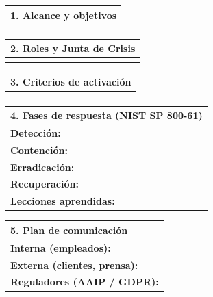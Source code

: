 \documentclass[12pt,a4paper]{article}
\renewcommand{\arraystretch}{1.25}
\begin{document}
\vspace{8pt}
\renewcommand{\arraystretch}{1.5}

\begin{tabularx}{\textwidth}{|X|}
\hline
\rowcolor{azulContinuidad!15}
\textbf{1. Alcance y objetivos} \\[2pt]
\hline
\\[1.5cm]
\hline
\end{tabularx}

\vspace{6pt}
\begin{tabularx}{\textwidth}{|X|}
\hline
\rowcolor{azulContinuidad!15}
\textbf{2. Roles y Junta de Crisis} \\[2pt]
\hline
\\[1.5cm]
\hline
\end{tabularx}

\vspace{6pt}
\begin{tabularx}{\textwidth}{|X|}
\hline
\rowcolor{azulContinuidad!15}
\textbf{3. Criterios de activaci\'on} \\[2pt]
\hline
\\[1.5cm]
\hline
\end{tabularx}

\vspace{6pt}
\begin{tabularx}{\textwidth}{|X|}
\hline
\rowcolor{azulContinuidad!15}
\textbf{4. Fases de respuesta (NIST SP 800-61)} \\[2pt]
\hline
\textbf{Detecci\'on:} \hrulefill \\[6pt]
\textbf{Contenci\'on:} \hrulefill \\[6pt]
\textbf{Erradicaci\'on:} \hrulefill \\[6pt]
\textbf{Recuperaci\'on:} \hrulefill \\[6pt]
\textbf{Lecciones aprendidas:} \hrulefill \\[1cm]
\hline
\end{tabularx}

\newpage
\begin{tabularx}{\textwidth}{|X|}
\hline
\rowcolor{azulContinuidad!15}
\textbf{5. Plan de comunicaci\'on} \\[2pt]
\hline
\textbf{Interna (empleados):} \hrulefill \\[6pt]
\textbf{Externa (clientes, prensa):} \hrulefill \\[6pt]
\textbf{Reguladores (AAIP / GDPR):} \hrulefill \\[1.5cm]
\hline
\end{tabularx}
\end{document}
